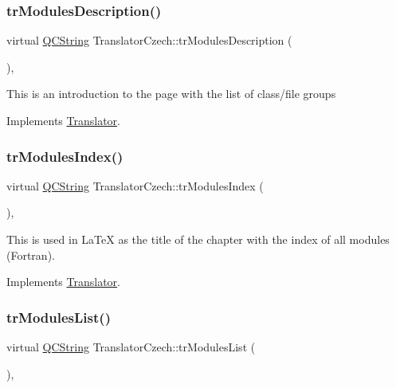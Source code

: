 \subsubsection{\texorpdfstring{trModulesDescription()}{trModulesDescription()}}
{\footnotesize\ttfamily virtual \mbox{\hyperlink{class_q_c_string}{Q\+C\+String}} Translator\+Czech\+::tr\+Modules\+Description (\begin{DoxyParamCaption}{ }\end{DoxyParamCaption})\hspace{0.3cm}{\ttfamily [inline]}, {\ttfamily [virtual]}}

This is an introduction to the page with the list of class/file groups 

Implements \mbox{\hyperlink{class_translator}{Translator}}.

\mbox{\label{class_translator_czech_ae1cbd927b31f6c87ff35f795fab9b2f2}} 
\subsubsection{\texorpdfstring{trModulesIndex()}{trModulesIndex()}}
{\footnotesize\ttfamily virtual \mbox{\hyperlink{class_q_c_string}{Q\+C\+String}} Translator\+Czech\+::tr\+Modules\+Index (\begin{DoxyParamCaption}{ }\end{DoxyParamCaption})\hspace{0.3cm}{\ttfamily [inline]}, {\ttfamily [virtual]}}

This is used in La\+TeX as the title of the chapter with the index of all modules (Fortran). 

Implements \mbox{\hyperlink{class_translator}{Translator}}.

\mbox{\label{class_translator_czech_a9be2c1531d001b7bf2452f4301ad5add}} 
\subsubsection{\texorpdfstring{trModulesList()}{trModulesList()}}
{\footnotesize\ttfamily virtual \mbox{\hyperlink{class_q_c_string}{Q\+C\+String}} Translator\+Czech\+::tr\+Modules\+List (\begin{DoxyParamCaption}{ }\end{DoxyParamCaption})\hspace{0.3cm}{\ttfamily [inline]}, {\ttfamily [virtual]}}

